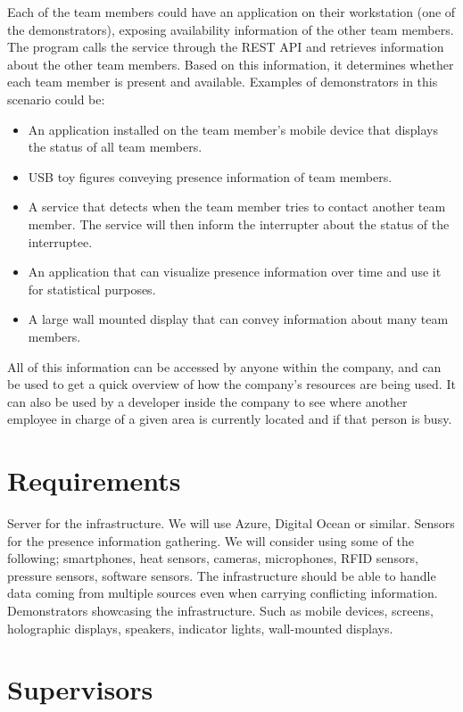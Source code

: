 \documentclass{sigchi}
\begin{document}
Each of the team members could have an application on their workstation (one of the demonstrators), exposing availability information of the other team members. The program calls the service through the REST API and retrieves information about the other team members. Based on this information, it determines whether each team member is present and available. Examples of demonstrators in this scenario could be:

\begin{itemize}
\item An application installed on the team member’s mobile device that displays the status of all team members.
\item USB toy figures conveying presence information of team members.
\item A service that detects when the team member tries to contact another team member. The service will then inform the interrupter about the status of the interruptee.
\item An application that can visualize presence information over time and use it for statistical purposes.
\item A large wall mounted display that can convey information about many team members.
\end{itemize}

All of this information can be accessed by anyone within the company, and can be used to get a quick overview of how the company’s resources are being used. It can also be used by a developer inside the company to see where another employee in charge of a given area is currently located and if that person is busy.

\section{Requirements}

Server for the infrastructure. We will use Azure, Digital Ocean or similar.
Sensors for the presence information gathering. We will consider using some of the following; smartphones, heat sensors, cameras, microphones, RFID sensors, pressure sensors, software sensors.
The infrastructure should be able to handle data coming from multiple sources even when carrying conflicting information.
Demonstrators showcasing the infrastructure. Such as mobile devices, screens, holographic displays, speakers, indicator lights, wall-mounted displays.

\section{Supervisors}
\end{document}
